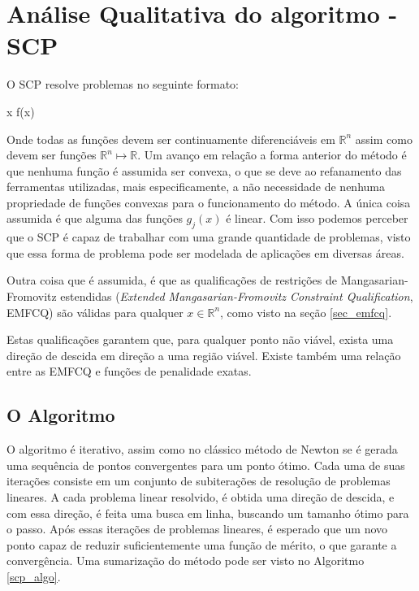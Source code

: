 \section{Análise Qualitativa do algoritmo - SCP}

\noindent
O SCP resolve problemas no seguinte formato:

\vspace{-15pt}
\begin{mini!}
{x}{ f(x) \label{scp_obj}}{\label{prob_scp}}{}
\end{mini!}

Onde todas as funções devem ser continuamente diferenciáveis em \(\mathbb{R}^n\) assim como
devem ser funções \( \mathbb{R}^n \mapsto \mathbb{R} \). Um avanço em relação a forma anterior
do método é que nenhuma função é assumida ser convexa, o que se deve ao refanamento das ferramentas
utilizadas, mais especificamente, a não necessidade de nenhuma propriedade de funções convexas para
o funcionamento do método. A única coisa assumida é que alguma das
funções \( g_j(x) \) é linear. Com isso podemos perceber que o SCP é capaz de trabalhar com uma
grande quantidade de problemas, visto que essa forma de problema pode ser modelada de aplicações
em diversas áreas.

Outra coisa que é assumida, é que as qualificações de restrições de Mangasarian-Fromovitz estendidas (\textit{Extended Mangasarian-Fromovitz Constraint Qualification}, EMFCQ)
\cite{di1994exact} são válidas para qualquer \( x \in \mathbb{R}^n \), como visto na seção \ref{sec_emfcq}.

Estas qualificações garantem que, para qualquer ponto não viável, exista uma
direção de descida em direção a uma região viável. Existe também uma relação entre as EMFCQ
e funções de penalidade exatas.


\subsection{O Algoritmo}

\noindent
O algoritmo é iterativo, assim como no clássico método de Newton se é gerada
uma sequência de pontos convergentes para um ponto ótimo.
Cada uma de suas iterações consiste em um conjunto de subiterações de
resolução de problemas lineares. A cada problema linear resolvido, é obtida
uma direção de descida, e com essa direção, é feita uma busca em linha,
buscando um tamanho ótimo para o passo. Após essas iterações de problemas
lineares, é esperado que um novo ponto capaz de reduzir suficientemente uma
função de mérito, o que garante a convergência. Uma sumarização do método pode
ser visto no Algoritmo \ref{scp_algo}.

